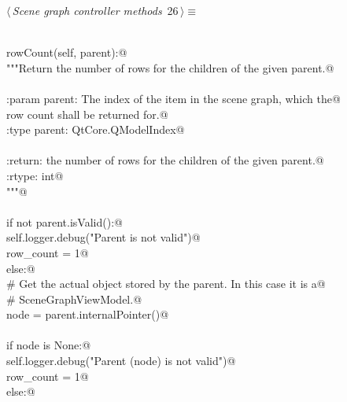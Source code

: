 \documentclass[
    a4paper,      %
    10pt,         %
    openright,    %
    notitlepage,  %
    parskip=half, %
]{scrreprt}       %
\theoremstyle{definition}                    %
\begin{document}
\begin{flushleft} \small
\begin{minipage}{\linewidth}\label{scrap25}\raggedright\small
{} $\langle\,${\itshape Scene graph controller methods}\nobreak\ {\footnotesize {26}}$\,\rangle\equiv$
\vspace{-1ex}
\begin{list}{}{} \item
\mbox{}\lstinline@@\\
\mbox{}\lstinline@def rowCount(self, parent):@\\
\mbox{}\lstinline@    """Return the number of rows for the children of the given parent.@\\
\mbox{}\lstinline@@\\
\mbox{}\lstinline@    :param parent: The index of the item in the scene graph, which the@\\
\mbox{}\lstinline@                    row count shall be returned for.@\\
\mbox{}\lstinline@    :type  parent: QtCore.QModelIndex@\\
\mbox{}\lstinline@@\\
\mbox{}\lstinline@    :return: the number of rows for the children of the given parent.@\\
\mbox{}\lstinline@    :rtype:  int@\\
\mbox{}\lstinline@    """@\\
\mbox{}\lstinline@@\\
\mbox{}\lstinline@    if not parent.isValid():@\\
\mbox{}\lstinline@        self.logger.debug("Parent is not valid")@\\
\mbox{}\lstinline@        row_count = 1@\\
\mbox{}\lstinline@    else:@\\
\mbox{}\lstinline@        # Get the actual object stored by the parent. In this case it is a@\\
\mbox{}\lstinline@        # SceneGraphViewModel.@\\
\mbox{}\lstinline@        node = parent.internalPointer()@\\
\mbox{}\lstinline@@\\
\mbox{}\lstinline@        if node is None:@\\
\mbox{}\lstinline@            self.logger.debug("Parent (node) is not valid")@\\
\mbox{}\lstinline@            row_count = 1@\\
\mbox{}\lstinline@        else:@\\

\end{list}
\end{minipage}
\end{flushleft}
\end{document}
